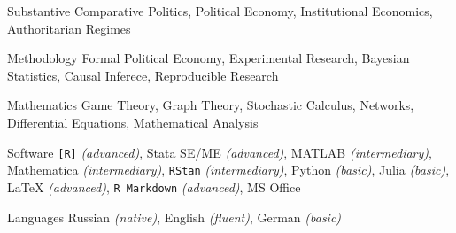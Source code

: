 

\begin{cvskills}

\cvskill
    {Substantive} %
    {Comparative Politics, Political Economy, Institutional Economics, Authoritarian Regimes}

\cvskill
    {Methodology} %
    {Formal Political Economy, Experimental Research, Bayesian Statistics, Causal Inferece, Reproducible Research}

\cvskill
    {Mathematics} %
    {Game Theory, Graph Theory, Stochastic Calculus, Networks, Differential Equations, Mathematical Analysis}

\cvskill
    {Software} %
    {\texttt{[R]} \emph{(advanced)}, Stata SE/ME \emph{(advanced)}, MATLAB \emph{(intermediary)}, Mathematica \emph{(intermediary)}, \texttt{RStan} \emph{(intermediary)}, Python \emph{(basic)}, Julia \emph{(basic)}, \LaTeX{} \emph{(advanced)}, \texttt{R Markdown} \emph{(advanced)}, MS Office} %


  \cvskill
    {Languages} %
    {Russian \emph{(native)}, English \emph{(fluent)}, German \emph{(basic)}} %

\end{cvskills}
